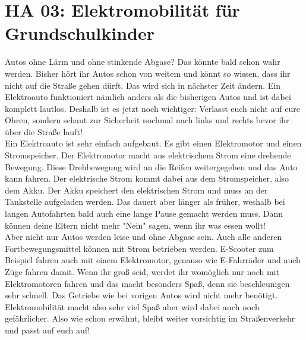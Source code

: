 \section{HA 03: Elektromobilität für Grundschulkinder}
  Autos ohne Lärm und ohne stinkende Abgase? Das könnte bald schon wahr werden. Bisher hört ihr Autos schon von weitem und könnt so wissen, dass ihr nicht auf die Straße gehen dürft. Das wird sich in nächster Zeit ändern. Ein Elektroauto funktioniert nämlich anders als die bisherigen Autos und ist dabei komplett lautlos. Deshalb ist es jetzt noch wichtiger: Verlasst euch nicht auf eure Ohren, sondern schaut zur Sicherheit nochmal nach links und rechts bevor ihr über die Straße lauft!\\
  Ein Elektroauto ist sehr einfach aufgebaut. Es gibt einen Elektromotor und einen Stromspeicher. Der Elektromotor macht aus elektrischem Strom eine drehende Bewegung. Diese Drehbewegung wird an die Reifen weitergegeben und das Auto kann fahren. Der elektrische Strom kommt dabei aus dem Stromspeicher, also dem Akku. Der Akku speichert den elektrischen Strom und muss an der Tankstelle aufgeladen werden. Das dauert aber länger als früher, weshalb bei langen Autofahrten bald auch eine lange Pause gemacht werden muss. Dann können deine Eltern nicht mehr "Nein" sagen, wenn ihr was essen wollt!\\
  Aber nicht nur Autos werden leise und ohne Abgase sein. Auch alle anderen Fortbewegungsmittel können mit Strom betrieben werden. E-Scooter zum Beispiel fahren auch mit einem Elektromotor, genauso wie E-Fahrräder und auch Züge fahren damit. Wenn ihr groß seid, werdet ihr womöglich nur noch mit Elektromotoren fahren und das macht besonders Spaß, denn sie beschleunigen sehr schnell. Das Getriebe wie bei vorigen Autos wird nicht mehr benötigt.\\
  Elektromobilität macht also sehr viel Spaß aber wird dabei auch noch gefährlicher. Also wie schon erwähnt, bleibt weiter vorsichtig im Straßenverkehr und passt auf euch auf!
